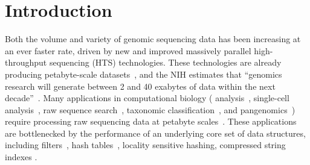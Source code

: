 


\section{Introduction}
\label{intro}







Both the volume and variety of genomic sequencing data has been increasing at an ever faster rate, driven by new and improved massively parallel high-throughput sequencing (HTS) technologies.  These technologies are already producing
petabyte-scale datasets~\cite{kodama2012sequence}, and the NIH estimates that ``genomics research will generate between 2 and 40 exabytes of data within the next decade''~\cite{NHGRIDataScience}. Many applications in computational biology (\kmer
analysis~\cite{MarccaisKi11}, single-cell analysis~\cite{he2022alevin}, raw sequence search~\cite{solomon2016fast}, taxonomic classification~\cite{wood2014kraken}, and pangenomics~\cite{computational2018computational})
require processing raw sequencing data at petabyte scales~\cite{kodama2012sequence}. 
%
These applications are bottlenecked by the performance of an underlying core set of data structures, including filters~\cite{cite-place-where-bottleneck}, hash tables~\cite{same}, locality sensitive hashing, compressed string indexes .
%


